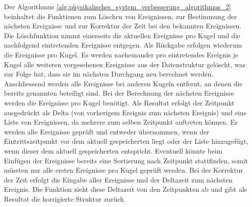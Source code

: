 \newpage
Der Algorithmus \ref{alg:physikalisches_system_verbesserung_algorithmus_2} beinhaltet die Funktionen zum Löschen von
Ereignissen, zur Bestimmung der nächsten Ereignisse und zur Korrektur der Zeit bei den bekannten Ereignissen.
Die Löschfunktion nimmt einerseits die aktuellen Ereignisse pro Kugel und die nachfolgend eintretenden Ereignisse
entgegen. Als Rückgabe erfolgen wiederum die Ereignisse pro Kugel.
Es werden nacheinander pro eintretendes Ereignis je Kugel alle weiteren vorgesehenen Ereignisse aus der Datenstruktur gelöscht,
was zur Folge hat, dass sie im nächsten Durchgang neu berechnet werden.
Anschliessend werden alle Ereignisse bei anderen Kugeln entfernt, an denen die bereits genannten beteiligt sind.
Bei der Berechnung der nächsten Ereignisse werden die Ereignisse pro Kugel benötigt.
Als Resultat erfolgt der Zeitpunkt ausgedrückt als Delta (von vorherigem Ereignis zum nächsten Ereignis)
und eine Liste von Ereignissen, da mehrere zum selben Zeitpunkt auftreten können.
Es werden alle Ereignisse geprüft und entweder übernommen, wenn der Eintrittszeitpunkt vor dem
aktuell gespeicherten liegt oder der Liste hinzugefügt, wenn dieser dem aktuell gespeicherten entspricht.
Eventuell könnte beim Einfügen der Ereignisse bereits eine Sortierung nach Zeitpunkt stattfinden, somit müssten nur
alle ersten Ereignisse pro Kugel geprüft werden. Bei der Korrektur der Zeit erfolgt die Eingabe
aller Ereignisse und der Deltazeit zum nächsten Ereignis. Die Funktion zieht diese Deltazeit von den
Zeitpunkten ab und gibt als Resultat die korrigierte Struktur zurück.
